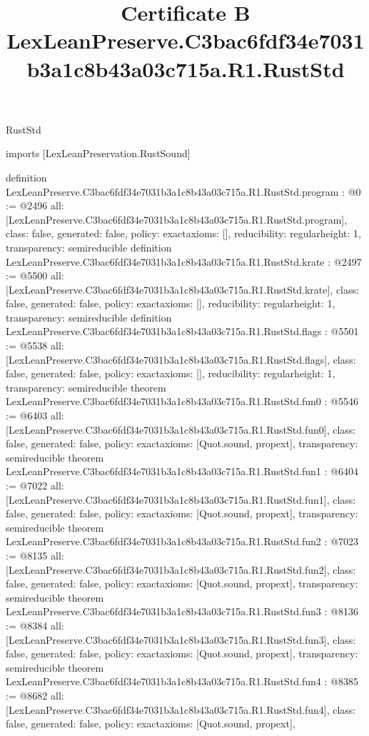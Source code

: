 \begin{lexlean}{RustStd}
\title{Certificate B LexLeanPreserve.C3bac6fdf34e7031b3a1c8b43a03c715a.R1.RustStd}
\begin{coremodule}
imports [LexLeanPreservation.RustSound]

definition LexLeanPreserve.C3bac6fdf34e7031b3a1c8b43a03c715a.R1.RustStd.program : @0 := @2496 {
  all: [LexLeanPreserve.C3bac6fdf34e7031b3a1c8b43a03c715a.R1.RustStd.program],
  class: false,
  generated: false,
  policy: exact{axioms: []},
  reducibility: regular{height: 1},
  transparency: semireducible
}
definition LexLeanPreserve.C3bac6fdf34e7031b3a1c8b43a03c715a.R1.RustStd.krate : @2497 := @5500 {
  all: [LexLeanPreserve.C3bac6fdf34e7031b3a1c8b43a03c715a.R1.RustStd.krate],
  class: false,
  generated: false,
  policy: exact{axioms: []},
  reducibility: regular{height: 1},
  transparency: semireducible
}
definition LexLeanPreserve.C3bac6fdf34e7031b3a1c8b43a03c715a.R1.RustStd.flags : @5501 := @5538 {
  all: [LexLeanPreserve.C3bac6fdf34e7031b3a1c8b43a03c715a.R1.RustStd.flags],
  class: false,
  generated: false,
  policy: exact{axioms: []},
  reducibility: regular{height: 1},
  transparency: semireducible
}
theorem LexLeanPreserve.C3bac6fdf34e7031b3a1c8b43a03c715a.R1.RustStd.fun0 : @5546 := @6403 {
  all: [LexLeanPreserve.C3bac6fdf34e7031b3a1c8b43a03c715a.R1.RustStd.fun0],
  class: false,
  generated: false,
  policy: exact{axioms: [Quot.sound, propext]},
  transparency: semireducible
}
theorem LexLeanPreserve.C3bac6fdf34e7031b3a1c8b43a03c715a.R1.RustStd.fun1 : @6404 := @7022 {
  all: [LexLeanPreserve.C3bac6fdf34e7031b3a1c8b43a03c715a.R1.RustStd.fun1],
  class: false,
  generated: false,
  policy: exact{axioms: [Quot.sound, propext]},
  transparency: semireducible
}
theorem LexLeanPreserve.C3bac6fdf34e7031b3a1c8b43a03c715a.R1.RustStd.fun2 : @7023 := @8135 {
  all: [LexLeanPreserve.C3bac6fdf34e7031b3a1c8b43a03c715a.R1.RustStd.fun2],
  class: false,
  generated: false,
  policy: exact{axioms: [Quot.sound, propext]},
  transparency: semireducible
}
theorem LexLeanPreserve.C3bac6fdf34e7031b3a1c8b43a03c715a.R1.RustStd.fun3 : @8136 := @8384 {
  all: [LexLeanPreserve.C3bac6fdf34e7031b3a1c8b43a03c715a.R1.RustStd.fun3],
  class: false,
  generated: false,
  policy: exact{axioms: [Quot.sound, propext]},
  transparency: semireducible
}
theorem LexLeanPreserve.C3bac6fdf34e7031b3a1c8b43a03c715a.R1.RustStd.fun4 : @8385 := @8682 {
  all: [LexLeanPreserve.C3bac6fdf34e7031b3a1c8b43a03c715a.R1.RustStd.fun4],
  class: false,
  generated: false,
  policy: exact{axioms: [Quot.sound, propext]},
}
\end{coremodule}
\end{lexlean}
